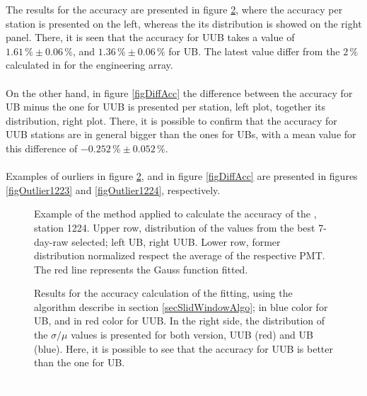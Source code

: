 \documentclass[twoside, final, 10pt]{articleMine}
\begin{document}
\noindent The results for the \qpkvem accuracy are presented in
figure \ref{figAccuracyResults}, where the accuracy per station
is presented on the left, whereas the its distribution is showed
on the right panel. There, it is seen that the accuracy for UUB
takes a value of $1.61\,\%\pm0.06\,\%$, and $1.36\,\%\pm0.06\,\%$
for UB. The latest value differ from the $2\,\%$ calculated in
\cite{gap2002-046} for the engineering array.\\\\On the other
hand, in figure \ref{figDiffAcc} the difference between the
accuracy for UB minus the one for UUB is presented per station,
left plot, together its distribution, right plot. There, it is
possible to confirm that the \qpkvem accuracy for UUB stations
are in general bigger than the ones for UBs, with a mean value
for this difference of $-0.252\,\%\pm0.052\,\%$.\\\\Examples of
ourliers in figure \ref{figAccuracyResults}, and in figure
\ref{figDiffAcc} are presented in figures \ref{figOutlier1223}
and \ref{figOutlier1224}, respectively.
\clearpage

\begin{figure}[!t]
  \label{figQpkNormalizedSt1224}
  \centering
  \caption{Example of the method applied to calculate the
  accuracy of the \qpkvem, station 1224. Upper row, distribution
  of the \qpkvem values from the best 7-day-raw selected; left
  UB, right UUB. Lower row, former distribution normalized
  respect the average of the respective PMT. The red line
  represents the Gauss function fitted.}
  \label{figQpkNormalizedSt1224}
\end{figure}

\begin{figure}[!t]
  \label{figAccuracyResults}
  \centering
  \caption{Results for the accuracy calculation of the \qpkvem
  fitting, using the algorithm describe in section 
  \ref{secSlidWindowAlgo}; in blue color for UB, and in red color
  for UUB. In the right side, the distribution of the
  $\sigma/\mu$ values is presented for both version, UUB (red)
  and UB (blue). Here, it is possible to see that the accuracy
  for UUB is better than the one for UB.}
  \label{figAccuracyResults}
\end{figure}
\textcolor{white}{hi}
\clearpage
\end{document}
